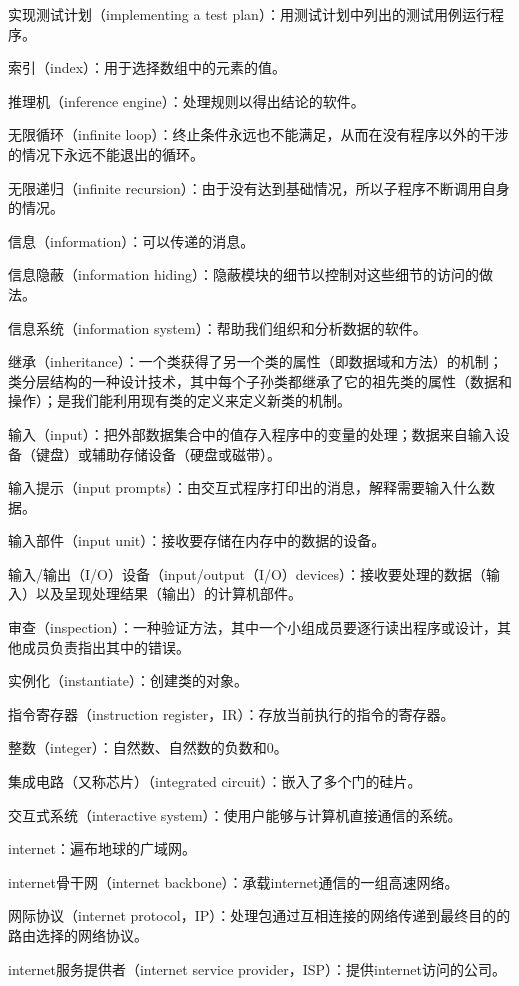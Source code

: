 实现测试计划（implementing a test plan）：用测试计划中列出的测试用例运行程序。

索引（index）：用于选择数组中的元素的值。

推理机（inference engine）：处理规则以得出结论的软件。

无限循环（infinite loop）：终止条件永远也不能满足，从而在没有程序以外的干涉的情况下永远不能退出的循环。

无限递归（infinite recursion）：由于没有达到基础情况，所以子程序不断调用自身的情况。

信息（information）：可以传递的消息。

信息隐蔽（information hiding）：隐蔽模块的细节以控制对这些细节的访问的做法。

信息系统（information system）：帮助我们组织和分析数据的软件。

继承（inheritance）：一个类获得了另一个类的属性（即数据域和方法）的机制；类分层结构的一种设计技术，其中每个子孙类都继承了它的祖先类的属性（数据和操作）；是我们能利用现有类的定义来定义新类的机制。

输入（input）：把外部数据集合中的值存入程序中的变量的处理；数据来自输入设备（键盘）或辅助存储设备（硬盘或磁带）。

输入提示（input prompts）：由交互式程序打印出的消息，解释需要输入什么数据。

输入部件（input unit）：接收要存储在内存中的数据的设备。

输入/输出（I/O）设备（input/output（I/O）devices）：接收要处理的数据（输入）以及呈现处理结果（输出）的计算机部件。

审查（inspection）：一种验证方法，其中一个小组成员要逐行读出程序或设计，其他成员负责指出其中的错误。

实例化（instantiate）：创建类的对象。

指令寄存器（instruction register，IR）：存放当前执行的指令的寄存器。

整数（integer）：自然数、自然数的负数和0。

集成电路（又称芯片）（integrated circuit）：嵌入了多个门的硅片。

交互式系统（interactive system）：使用户能够与计算机直接通信的系统。

internet：遍布地球的广域网。

internet骨干网（internet backbone）：承载internet通信的一组高速网络。

网际协议（internet protocol，IP）：处理包通过互相连接的网络传递到最终目的的路由选择的网络协议。

internet服务提供者（internet service provider，ISP）：提供internet访问的公司。

